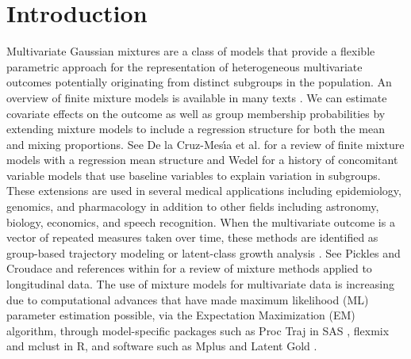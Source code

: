 \documentclass[10pt]{article}
\begin{document}
 
  \section{Introduction}
\noindent Multivariate Gaussian mixtures are a class of models that provide a flexible parametric approach for the representation of heterogeneous multivariate outcomes potentially originating from distinct subgroups in the population. An overview of finite mixture models is available in many texts \cite{everitt1981,titterington1985,mclachlan1988,mclachlan2000,fruhwirth2006}. We can estimate covariate effects on the outcome as well as group membership probabilities by extending mixture models to include a regression structure for both the mean and mixing proportions. See De la Cruz-Mes\'{\i}a et al. \cite{cruzmesia2008} for a review of finite mixture models with a regression mean structure and Wedel \cite{wedel2002} for a history of concomitant variable models that use baseline variables to explain variation in subgroups. These extensions are used in several medical applications  \cite{pranab2011} including epidemiology, genomics, and pharmacology in addition to other fields including astronomy, biology, economics, and speech recognition. When the multivariate outcome is a vector of repeated measures taken over time, these methods are identified as group-based trajectory modeling \cite{nagin1999,nagin2005} or latent-class growth analysis \cite{muthen2000, muthen2001}. See Pickles and Croudace \cite{pickles2010} and references within for a review of mixture methods applied to longitudinal data. The use of mixture models for multivariate data is increasing due to computational advances that have made maximum likelihood (ML) parameter estimation possible, via the Expectation Maximization (EM) algorithm, through model-specific packages such as Proc Traj in SAS \cite{jones2001}, flexmix  \cite{leisch2004} and mclust \cite{fraley1999} in R, and software such as Mplus \cite{muthen2010} and Latent Gold \cite{vermunt2005}.\\
\end{document}

